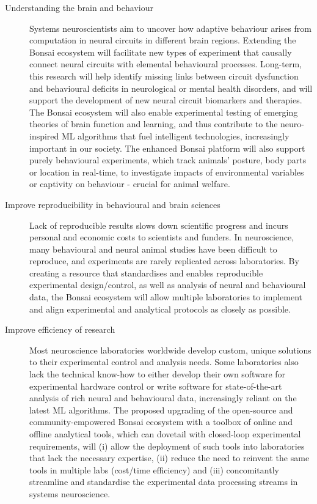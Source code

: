 \documentclass[a4paper,11pt]{article}
\begin{document}
\begin{description}

    \item[Understanding the brain and behaviour] Systems neuroscientists aim to
        uncover how adaptive behaviour arises from computation in neural
        circuits in different brain regions. Extending the Bonsai ecosystem
        will facilitate new types of experiment that causally connect neural
        circuits with elemental behavioural processes. Long-term, this research
        will help identify missing links between circuit dysfunction and
        behavioural deficits in neurological or mental health disorders, and
        will support the development of new neural circuit biomarkers
        and therapies. The Bonsai ecosystem will also enable  experimental
        testing of emerging theories of brain function and learning, and thus
        contribute to the neuro-inspired ML algorithms that fuel
        intelligent technologies, increasingly important in our society.  The
        enhanced Bonsai platform will also support purely behavioural
        experiments, which track animals' posture, body parts or location in real-time, to investigate impacts of environmental variables
        or captivity on behaviour - crucial for
        animal welfare.   

    \item[Improve reproducibility in behavioural and brain sciences] Lack of
        reproducible results slows down scientific progress and incurs personal
        and economic costs to scientists and funders.  In neuroscience,  many
        behavioural and neural animal studies have been difficult to
        reproduce, and experiments are rarely replicated across laboratories.
        By creating a resource that standardises and enables reproducible
        experimental design/control, as well as analysis of neural and
        behavioural data, the Bonsai ecosystem will allow multiple laboratories
        to implement and align experimental and analytical protocols as closely
        as possible.

    \item[Improve efficiency of research] Most neuroscience laboratories
        worldwide develop custom, unique solutions to their experimental
        control and analysis needs. Some laboratories also lack the technical
        know-how to either develop their own software for experimental hardware
        control or write software for state-of-the-art analysis of rich
        neural and behavioural data, increasingly reliant on the latest ML algorithms. The proposed upgrading of the open-source and
        community-empowered Bonsai ecosystem with a toolbox of online and
        offline analytical tools, which can dovetail with closed-loop
        experimental requirements, will (i) allow the deployment of such tools
        into laboratories that lack the necessary expertise, (ii) reduce the need to
        reinvent the same tools in multiple labs (cost/time efficiency) and
        (iii) concomitantly streamline and standardise the experimental data
        processing streams in systems neuroscience.

\end{description}
\end{document}
